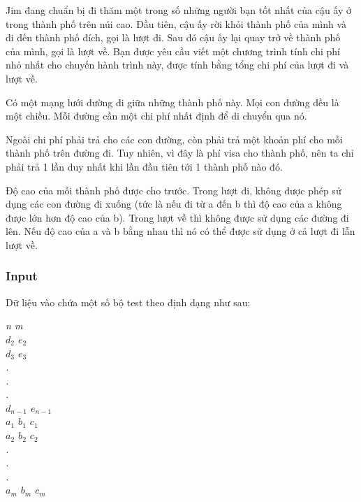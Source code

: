 







      Jim đang chuẩn bị đi thăm một trong số những người bạn tốt nhất của cậu ấy ở trong thành phố trên núi cao. Đầu tiên, cậu ấy rời khỏi thành phố của mình và đi đến thành phố đích, gọi là lượt đi. Sau đó cậu ấy lại quay trở về thành phố của mình, gọi là lượt về. Bạn được yêu cầu viết một chương trình tính chi phí nhỏ nhất cho chuyến hành trình này, được tính bằng tổng chi phí của lượt đi và lượt về.     

      Có một mạng lưới đường đi giữa những thành phố này. Mọi con đường đều là một chiều. Mỗi đường cần một chi phí nhất định để di chuyển qua nó.     

      Ngoài chi phí phải trả cho các con đường, còn phải trả một khoản phí cho mỗi thành phố trên đường đi. Tuy nhiên, vì đây là phí visa cho thành phố, nên ta chỉ phải trả 1 lần duy nhất khi lần đầu tiên tới 1 thành phố nào đó.     

      Độ cao của mỗi thành phố được cho trước. Trong lượt đi, không được phép sử dụng các con đường đi xuống (tức là nếu đi từ a đến b thì độ cao của a không được lớn hơn độ cao của b). Trong lượt về thì không được sử dụng các đường đi lên. Nếu độ cao của a và b bằng nhau thì nó có thể được sử dụng ở cả lượt đi lẫn lượt về.     

\subsubsection{      Input     }

      Dữ liệu vào chứa một số bộ test theo định dạng như sau:     

\emph{       n m       
\\       $d_{2}$       $e_{2}$
\\       $d_{3}$       $e_{3}$
\\       .       
\\       .       
\\       .       
\\       $d_{n-1}$       $e_{n-1}$
\\       $a_{1}$       $b_{1}$       $c_{1}$
\\       $a_{2}$       $b_{2}$       $c_{2}$
\\       .       
\\       .       
\\       .       
\\       $a_{m}$       $b_{m}$       $c_{m}$}

